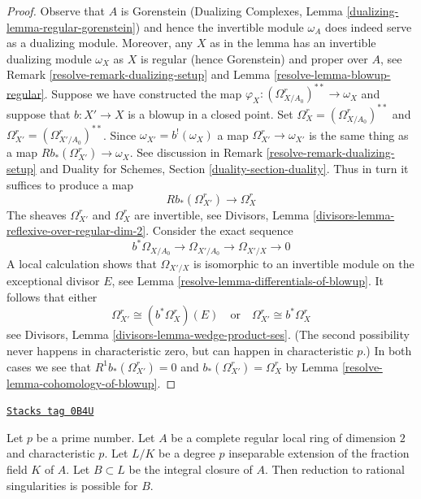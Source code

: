\begin{proof}

Observe that $A$ is Gorenstein (Dualizing Complexes,
Lemma \ref{dualizing-lemma-regular-gorenstein})
and hence the invertible module $\omega_A$ does indeed serve
as a dualizing module. Moreover, any $X$ as in the lemma
has an invertible dualizing module $\omega_X$ as $X$ is regular
(hence Gorenstein) and proper over $A$, see
Remark \ref{resolve-remark-dualizing-setup} and
Lemma \ref{resolve-lemma-blowup-regular}.
Suppose we have constructed the map
$\varphi_X : (\Omega^r_{X/A_0})^{**} \to \omega_X$
and suppose that $b : X' \to X$ is a blowup in a closed point.
Set $\Omega^r_X = (\Omega^r_{X/A_0})^{**}$ and
$\Omega^r_{X'} = (\Omega^r_{X'/A_0})^{**}$. Since $\omega_{X'} = b^!(\omega_X)$
a map $\Omega^r_{X'} \to \omega_{X'}$ is the same thing as a map
$Rb_*(\Omega^r_{X'}) \to \omega_X$. See discussion in
Remark \ref{resolve-remark-dualizing-setup} and
Duality for Schemes, Section \ref{duality-section-duality}.
Thus in turn it suffices to produce a map
$$
Rb_*(\Omega^r_{X'}) \longrightarrow \Omega^r_X
$$
The sheaves $\Omega^r_{X'}$ and $\Omega^r_X$ are invertible, see
Divisors, Lemma \ref{divisors-lemma-reflexive-over-regular-dim-2}.
Consider the exact sequence
$$
b^*\Omega_{X/A_0} \to \Omega_{X'/A_0} \to \Omega_{X'/X} \to 0
$$
A local calculation shows that $\Omega_{X'/X}$ is isomorphic
to an invertible module on the exceptional divisor $E$, see
Lemma \ref{resolve-lemma-differentials-of-blowup}. It follows that
either
$$
\Omega^r_{X'} \cong (b^*\Omega^r_X)(E)
\quad\text{or}\quad
\Omega^r_{X'} \cong b^*\Omega^r_X
$$
see Divisors, Lemma \ref{divisors-lemma-wedge-product-ses}.
(The second possibility never happens in characteristic zero, but
can happen in characteristic $p$.) In both cases we see that
$R^1b_*(\Omega^r_{X'}) = 0$ and $b_*(\Omega^r_{X'}) = \Omega^r_X$ by
Lemma \ref{resolve-lemma-cohomology-of-blowup}.
\end{proof}

\begin{lemma}[Go up degree p]
\label{resolve-lemma-go-up-degree-p}
\href{https://stacks.math.columbia.edu/tag/0B4U}{\texttt{Stacks tag 0B4U}}

Let $p$ be a prime number. Let $A$ be a complete regular local ring of
dimension $2$ and characteristic $p$. Let $L/K$ be a degree $p$ inseparable
extension of the fraction field $K$ of $A$. Let $B \subset L$ be the integral
closure of $A$. Then reduction to rational singularities is possible for $B$.
\end{lemma}

